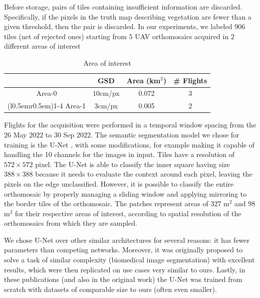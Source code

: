\documentclass[comsoc,final]{IEEEtran}
\newcommand{\todo}[1]{\textcolor{red}{#1}}
\begin{document}
Before storage, pairs of tiles containing insufficient information are discarded. Specifically, if the pixels in the truth map describing vegetation are fewer than a given threshold, then the pair is discarded. In our experiments, we labeled $906$ tiles (net of rejected ones) starting from $5$ UAV orthomosaics acquired in $2$ different areas of interest 
\begin{table}[htbp]
  \centering
  \caption{Area of interest}
  \label{tab:aoi}
  \begin{tabular}{c*{3}{c}}
\toprule
           & GSD     & Area (km$^2$)             & \# Flights  \\
    \midrule
    Area-0  & $10$cm/px& 0.072 & $3$  \\
    \cmidrule(l{0.5em}r{0.5em}){1-4}
    Area-1 & $3$cm/px & 0.005 & $ 2 $  \\
    \bottomrule
  \end{tabular}
\end{table}
Flights for the acquisition were performed in a temporal window spacing from the $26$ May $2022$ to $30$ Sep $2022$. The semantic segmentation model we chose for training is the U-Net 
\cite{ronneberger_u-net_2015}, with some modifications, 
for example making it capable of handling the 10 channels for the images in input. 
Tiles have a resolution of $572\times572$ pixel. The U-Net is able to classify the inner square having size $388\times388$ because it needs to evaluate the context around each pixel, leaving the pixels on the edge unclassified. However, it is possible to classify the entire orthomosaic by properly managing a sliding window and applying mirroring to the border tiles of the orthomosaic. The patches represent areas of 327 m$^2$  and $98$ m$^2$ for their respective areas of interest, according to spatial resolution of the orthomosaics from which they are sampled.



We chose U-Net over other similar architectures for several reasons: it has fewer parameters than competing networks. Moreover, it was originally proposed to solve a task of similar complexity (biomedical image segmentation) with excellent results, which were then replicated on use cases very similar to ours. Lastly, in these publications (and also in the original work) the U-Net was trained from scratch with datasets of comparable size to ours (often even smaller).
\end{document}
